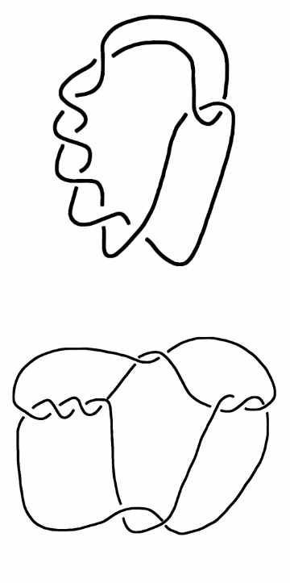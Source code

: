 \documentclass[12pt]{amsart}
\begin{document}
\thispagestyle{empty}

\begin{figure}
\begin{subfigure}[b]{0.2\textwidth}
\includegraphics[width=\textwidth]{images/twistknot.png}
\end{subfigure}\qquad
\begin{subfigure}[b]{0.2\textwidth}
\includegraphics[width=\textwidth]{images/goeritz.png}

\end{subfigure}
\end{figure}
\end{document}
